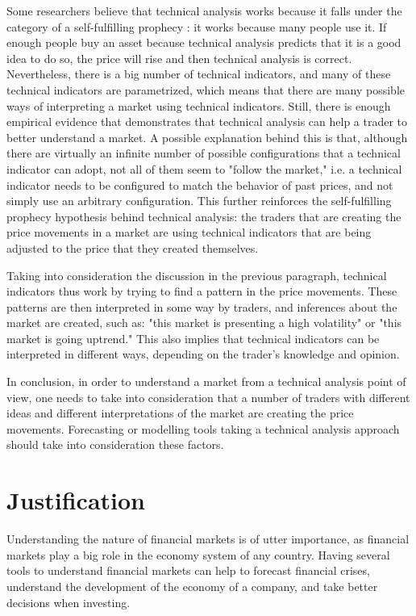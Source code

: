 Some researchers believe that technical analysis works because it falls under the category of a self-fulfilling prophecy \cite{salganik2008leading}: it works because many people use it. If enough people buy an asset because technical analysis predicts that it is a good idea to do so, the price will rise and then technical analysis is correct. Nevertheless, there is a big number of technical indicators, and many of these technical indicators are parametrized, which means that there are many possible ways of interpreting a market using technical indicators. Still, there is enough empirical evidence that demonstrates that technical analysis can help a trader to better understand a market. A possible explanation behind this is that, although there are virtually an infinite number of possible configurations that a technical indicator can adopt, not all of them seem to "follow the market," i.e. a technical indicator needs to be configured to match the behavior of past prices, and not simply use an arbitrary configuration. This further reinforces the self-fulfilling prophecy hypothesis behind technical analysis: the traders that are creating the price movements in a market are using technical indicators that are being adjusted to the price that they created themselves.

Taking into consideration the discussion in the previous paragraph, technical indicators thus work by trying to find a pattern in the price movements. These patterns are then interpreted in some way by traders, and inferences about the market are created, such as: "this market is presenting a high volatility" or "this market is going uptrend." This also implies that technical indicators can be interpreted in different ways, depending on the trader's knowledge and opinion.

In conclusion, in order to understand a market from a technical analysis point of view, one needs to take into consideration that a number of traders with different ideas and different interpretations of the market are creating the price movements. Forecasting or modelling tools taking a technical analysis approach should take into consideration these factors.

\section{Justification}
\label{section:justification}

Understanding the nature of financial markets is of utter importance, as financial markets play a big role in the economy system of any country. Having several tools to understand financial markets can help to forecast financial crises, understand the development of the economy of a company, and take better decisions when investing.

